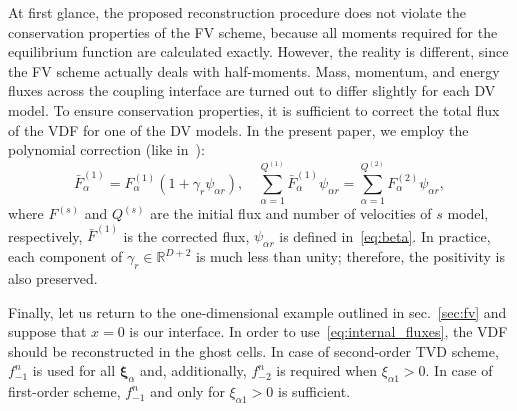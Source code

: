 \documentclass{article}
\newcommand{\bxi}{{\boldsymbol{\xi}}}
\newcommand{\bxia}{\bxi_\alpha}
\begin{document}
At first glance, the proposed reconstruction procedure does not violate the conservation properties of the FV scheme,
because all moments required for the equilibrium function are calculated exactly.
However, the reality is different, since the FV scheme actually deals with half-moments.
Mass, momentum, and energy fluxes across the coupling interface are turned out
to differ slightly for each DV model.
To ensure conservation properties, it is sufficient to correct the total flux of the VDF for one of the DV models.
In the present paper, we employ the polynomial correction (like in~\cite{Aristov1980}):
\begin{equation}\label{eq:poly_correction}
    \bar{F}^{(1)}_\alpha = F^{(1)}_\alpha(1+\gamma_r\psi_{\alpha r}), \quad
    \sum_{\alpha=1}^{Q^{(1)}} \bar{F}^{(1)}_\alpha\psi_{\alpha r} = \sum_{\alpha=1}^{Q^{(2)}} F^{(2)}_\alpha\psi_{\alpha r},
\end{equation}
where \(F^{(s)}\) and \(Q^{(s)}\) are the initial flux and number of velocities of \(s\) model, respectively,
\(\bar{F}^{(1)}\) is the corrected flux, \(\psi_{\alpha r}\) is defined in~\eqref{eq:beta}.
In practice, each component of \(\gamma_r\in\mathbb{R}^{D+2}\) is much less than unity;
therefore, the positivity is also preserved.

Finally, let us return to the one-dimensional example outlined in sec.~\ref{sec:fv}
and suppose that \(x=0\) is our interface.
In order to use~\eqref{eq:internal_fluxes}, the VDF should be reconstructed in the ghost cells.
In case of second-order TVD scheme, \(f_{-1}^n\) is used for all \(\bxia\) and, additionally,
\(f_{-2}^n\) is required when \(\xi_{\alpha1}>0\).
In case of first-order scheme, \(f_{-1}^n\) and only for \(\xi_{\alpha1}>0\) is sufficient.
\end{document}
